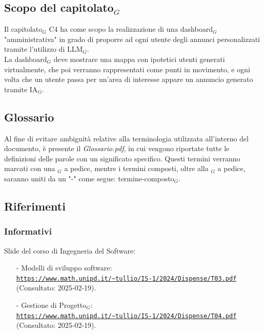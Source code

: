 \documentclass[10pt]{article}
\begin{document}
\subsection{Scopo del capitolato$_G$}
Il capitolato$_G$ C4 ha come scopo la realizzazione di una dashboard$_G$ "amministrativa" in grado di proporre ad ogni utente degli annunci personalizzati tramite l'utilizzo di LLM$_G$.\\ 
La dashboard$_G$ deve mostrare una mappa con ipotetici utenti generati virtualmente, che poi verranno rappresentati come punti in movimento, e ogni volta che un utente passa per un'area di interesse appare un annuncio generato tramite IA$_G$.

\subsection{Glossario}
Al fine di evitare ambiguità relative alla terminologia utilizzata all'interno del documento, è presente il \textit{Glossario.pdf}, in cui vengono riportate tutte le definizioni delle parole con un significato specifico. Questi termini verranno marcati con una $_G$ a pedice, mentre i termini composti, oltre alla $_G$ a pedice, saranno uniti da un "-" come segue: termine-composto$_G$. 

\subsection{Riferimenti}
\subsubsection{Informativi}
Slide del corso di Ingegneria del Software:
\begin{itemize}
\item [-] Modelli di sviluppo software:\\ \textcolor{blue}{\texttt{\url{https://www.math.unipd.it/~tullio/IS-1/2024/Dispense/T03.pdf}}}\\
(Consultato: 2025-02-19).
\item [-] Gestione di Progetto$_G$:\\ \textcolor{blue}{\texttt{\url{https://www.math.unipd.it/~tullio/IS-1/2024/Dispense/T04.pdf}}}\\
(Consultato: 2025-02-19).
\end{itemize}
\end{document}
